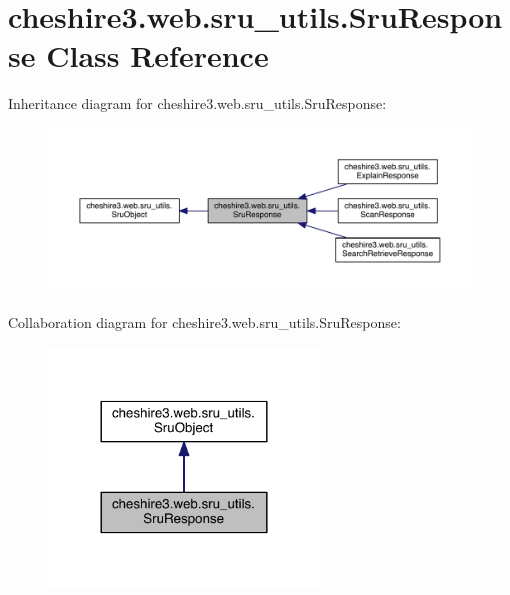 \hypertarget{classcheshire3_1_1web_1_1sru__utils_1_1_sru_response}{\section{cheshire3.\-web.\-sru\-\_\-utils.\-Sru\-Response Class Reference}
\label{classcheshire3_1_1web_1_1sru__utils_1_1_sru_response}
}


Inheritance diagram for cheshire3.\-web.\-sru\-\_\-utils.\-Sru\-Response\-:
\nopagebreak
\begin{figure}[H]
\begin{center}
\leavevmode
\includegraphics[width=350pt]{classcheshire3_1_1web_1_1sru__utils_1_1_sru_response__inherit__graph}
\end{center}
\end{figure}


Collaboration diagram for cheshire3.\-web.\-sru\-\_\-utils.\-Sru\-Response\-:
\nopagebreak
\begin{figure}[H]
\begin{center}
\leavevmode
\includegraphics[width=204pt]{classcheshire3_1_1web_1_1sru__utils_1_1_sru_response__coll__graph}
\end{center}
\end{figure}
